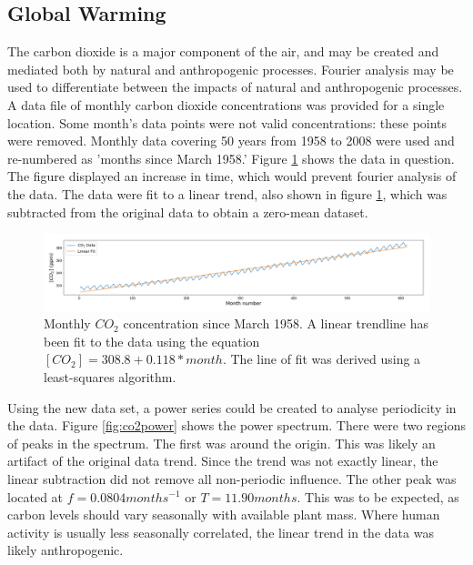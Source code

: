\message{ !name(Assn2.tex)}\documentclass[twocolumn]{article}
\begin{document}
\subsection{Global Warming}
The carbon dioxide is a major component of the air, and may be created and mediated both by natural and anthropogenic processes. Fourier analysis may be used to differentiate between the impacts of natural and anthropogenic processes. A data file of monthly carbon dioxide concentrations was provided for a single location. Some month's data points were not valid concentrations: these points were removed. Monthly data covering 50 years from 1958 to 2008 were used and re-numbered as 'months since March 1958.' Figure \ref{fig:co2trend} shows the data in question. The figure displayed an increase in time, which would prevent fourier analysis of the data. The data were fit to a linear trend, also shown in figure \ref{fig:co2trend}, which was subtracted from the original data to obtain a zero-mean dataset. 

\begin{figure}
\centering
\includegraphics[width=\textwidth]{co2trend}
\caption{Monthly $CO_2$ concentration since March 1958. A linear trendline has been fit to the data using the equation $[CO_2] = 308.8 + 0.118*month$. The line of fit was derived using a least-squares algorithm.}
\label{fig:co2trend}
\end{figure}

Using the new data set, a power series could be created to analyse periodicity in the data. Figure \ref{fig:co2power} shows the power spectrum. There were two regions of peaks in the spectrum. The first was around the origin. This was likely an artifact of the original data trend. Since the trend was not exactly linear, the linear subtraction did not remove all non-periodic influence. The other peak was located at $f=0.0804 months^{-1}$ or $T=11.90 months$. This was to be expected, as carbon levels should vary seasonally with available plant mass. Where human activity is usually less seasonally correlated, the linear trend in the data was likely anthropogenic.
\end{document}
